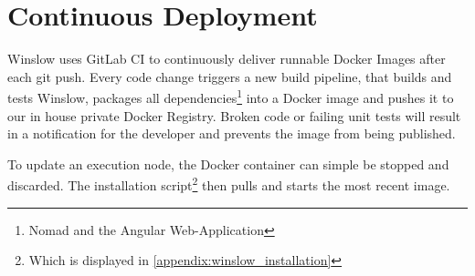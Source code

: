 \section{Continuous Deployment}

Winslow uses GitLab CI to continuously deliver runnable Docker Images after each git push.
Every code change triggers a new build pipeline, that builds and tests Winslow, packages all dependencies\footnote{Nomad and the Angular Web-Application} into a Docker image and pushes it to our in house private Docker Registry.
Broken code or failing unit tests will result in a notification for the developer and prevents the image from being published.

To update an execution node, the Docker container can simple be stopped and discarded.
The installation script\footnote{Which is displayed in \autoref{appendix:winslow_installation}} then pulls and starts the most recent image.